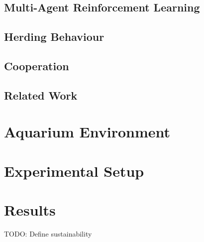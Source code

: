 \documentclass[letterpaper]{article}
\begin{document}
\subsection{Multi-Agent Reinforcement Learning}

\blindtext[3]

\subsection{Herding Behaviour}

\blindtext[2]

\subsection{Cooperation}

\blindtext[2]

\subsection{Related Work}

\blindtext[5]

\section{Aquarium Environment}

\blindtext[5]

\section{Experimental Setup}

\blindtext[2]

\section{Results}

TODO: Define sustainability
\end{document}
